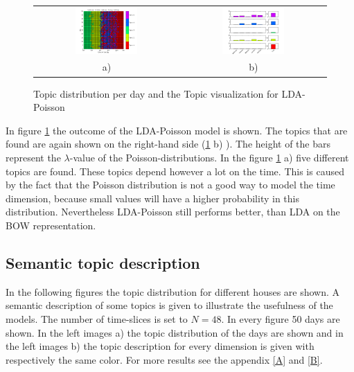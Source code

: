 \pagebreak
\begin{figure}
 \centering
 \begin{tabular}{c c}
  \centering
  \includegraphics[width=0.45\textwidth]{Pictures/TopDayHN3TS96k5Pois.png}
  &
  \includegraphics[width=0.45\textwidth]{Pictures/TopVisuHN3TS96k5Pois.png}\\
    a) & b)
 \end{tabular}
 \caption{Topic distribution per day and the Topic visualization for LDA-Poisson}
 \label{fig:Pois96}
\end{figure}  


In figure \ref{fig:Pois96} the outcome of the LDA-Poisson model is shown. The topics that are found are again shown on the right-hand side (\ref{fig:Pois96} b) ). The height of the bars represent the $\lambda$-value of the Poisson-distributions.
In the figure \ref{fig:Pois96} a) five different topics are found. These topics depend however a lot on the time. This is caused by the fact that the Poisson distribution is not a good way to model the time dimension, because small values will have a higher probability in this distribution. Nevertheless LDA-Poisson still performs better, than LDA on the BOW representation.



\subsection{Semantic topic description}
In the following figures the topic distribution for different houses are shown. A semantic description of some topics is given to illustrate the usefulness of the models. The number of time-slices is set to $N=48$. In every figure 50 days are shown. In the left images a) the topic distribution of the days are shown and in the left images b) the topic description for every dimension is given with respectively the same color. For more results see the appendix \ref{A} and \ref{B}.\\


